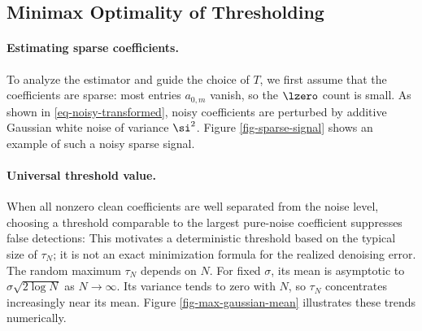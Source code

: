                                                      
\subsection{Minimax Optimality of Thresholding}
\label{subsec-minimax-denoise}

  
\paragraph{Estimating sparse coefficients.}

To analyze the estimator and guide the choice of $T$, we first assume that the coefficients
are sparse: most entries $a_{0,m}$ vanish, so the $\lzero$ count
is small. 
As shown in \eqref{eq-noisy-transformed}, noisy coefficients 
are perturbed by additive Gaussian white noise of variance $\si^2$. Figure \ref{fig-sparse-signal} shows an example of such a noisy sparse signal.



           
                                            
   
                                                     
                           

  
\paragraph{Universal threshold value.}

When all nonzero clean coefficients are well separated from the noise level, choosing a threshold comparable to the largest pure-noise coefficient suppresses false detections:
This motivates a deterministic threshold based on the typical size of $\tau_N$; it is not an exact minimization formula for the realized denoising error.
The random maximum $\tau_N$ depends on $N$. For fixed $\sigma$, its mean is asymptotic to $\sigma\sqrt{2\log N}$ as $N\to\infty$. Its variance tends to zero with $N$, so $\tau_N$ concentrates increasingly near its mean. Figure \ref{fig-max-gaussian-mean} illustrates these trends numerically.

